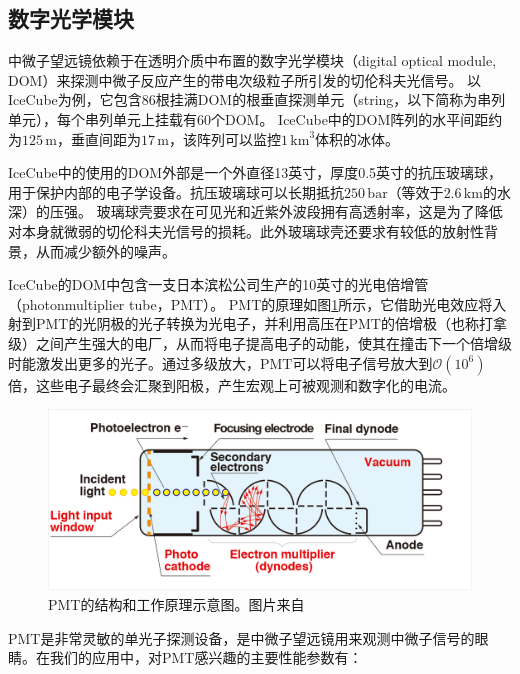 \subsection{数字光学模块}

中微子望远镜依赖于在透明介质中布置的数字光学模块（digital optical module, DOM）来探测中微子反应产生的带电次级粒子所引发的切伦科夫光信号。
以IceCube为例，它包含86根挂满DOM的根垂直探测单元（string，以下简称为串列单元），每个串列单元上挂载有60个DOM\cite{IceCube_detector:2016}。
IceCube中的DOM阵列的水平间距约为$125\,\mathrm{m}$，垂直间距为$17\,\mathrm{m}$，该阵列可以监控$1\,\mathrm{km}^3$体积的冰体。

IceCube中的使用的DOM外部是一个外直径13英寸，厚度0.5英寸的抗压玻璃球，用于保护内部的电子学设备。抗压玻璃球可以长期抵抗$250\,\mathrm{bar}$（等效于$2.6\,\mathrm{km}$的水深）的压强。
玻璃球壳要求在可见光和近紫外波段拥有高透射率，这是为了降低对本身就微弱的切伦科夫光信号的损耗。此外玻璃球壳还要求有较低的放射性背景，从而减少额外的噪声。

IceCube的DOM中包含一支日本滨松公司生产的10英寸的光电倍增管（photonmultiplier tube，PMT）\cite{IceCube_PMT:2010}。
PMT的原理如图\ref{fig:PMT_structure}所示，它借助光电效应将入射到PMT的光阴极的光子转换为光电子，并利用高压在PMT的倍增极（也称打拿级）之间产生强大的电厂，从而将电子提高电子的动能，使其在撞击下一个倍增级时能激发出更多的光子。通过多级放大，PMT可以将电子信号放大到$\mathcal{O}(10^6)$倍，这些电子最终会汇聚到阳极，产生宏观上可被观测和数字化的电流。

\begin{figure}[htb]
    \centering
    \includegraphics[width=0.85\linewidth]{img/PMT_structure.png}
    \caption{PMT的结构和工作原理示意图。图片来自\cite{PMT_handbook:2016}}
    \label{fig:PMT_structure}
\end{figure}

PMT是非常灵敏的单光子探测设备，是中微子望远镜用来观测中微子信号的眼睛。在我们的应用中，对PMT感兴趣的主要性能参数有：

